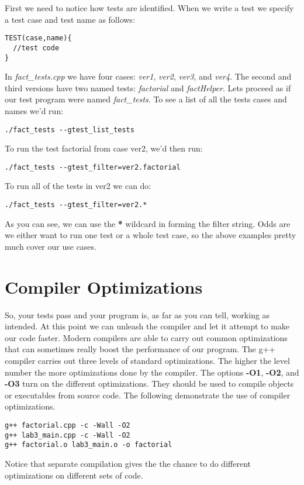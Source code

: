 \documentclass[]{tufte-handout}
\begin{document}
First we need to notice how tests are identified. When we write a test we specify a test case and test name as follows:
\begin{verbatim}
TEST(case,name){ 
  //test code
}
\end{verbatim}
In \textit{fact\_tests.cpp} we have four cases: \textit{ver1}, \textit{ver2}, \textit{ver3}, and \textit{ver4}. The second and third versions have two named tests: \textit{factorial} and \textit{factHelper}.  Lets proceed as if our test program were named \textit{fact\_tests}. To see a list of all the tests cases and names we'd run:
\begin{verbatim} 
./fact_tests --gtest_list_tests
\end{verbatim}
To run the test factorial from case ver2, we'd then run:
\begin{verbatim}
./fact_tests --gtest_filter=ver2.factorial
\end{verbatim}
To run all of the tests in ver2 we can do:
\begin{verbatim}
./fact_tests --gtest_filter=ver2.*
\end{verbatim}
As you can see, we can use the \textbf{*} wildcard in forming the filter string. Odds are we either want to run one test or a whole test case, so the above examples pretty much cover our use cases.
 
\section{Compiler Optimizations}

So, your tests pass and your program is, as far as you can tell, working as intended.  At this point we can unleash the compiler and let it attempt to make our code faster. Modern compilers are able to carry out common optimizations that can sometimes really boost the performance of our program. The g++ compiler carries out three levels of standard optimizations.  The higher the level number the more optimizations done by the compiler. The options \textbf{-O1}, \textbf{-O2}, and \textbf{-O3} turn on the different optimizations. They should be used to compile objects or executables from source code. The following demonstrate the use of compiler optimizations.
\begin{verbatim}
g++ factorial.cpp -c -Wall -O2 
g++ lab3_main.cpp -c -Wall -O2 
g++ factorial.o lab3_main.o -o factorial
\end{verbatim}
Notice that separate compilation gives the the chance to do different optimizations on different sets of code.  
\end{document}
